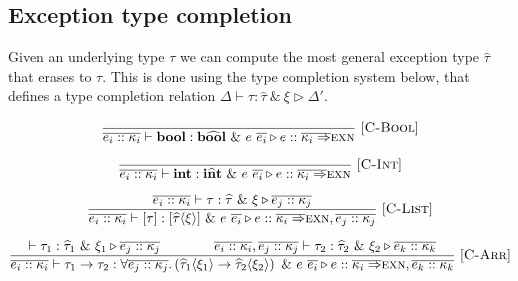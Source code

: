 \documentclass{llncs}
\newcommand{\VER}{\\[1.5ex]}
\newcommand{\Rule}[3]{\frac{#2}{#3}\mbox{\ [\textsc{#1}]}}
\newcommand{\Throws}[2]{#1\langle #2\rangle}    %
\newcommand{\ExnTy}{\widehat\tau}
\newcommand{\ExnTyBool}{\mathrm{b\widehat{oo}l}}    %
\newcommand{\ExnTyList}[2]{\left[\Throws{#1}{#2}\right]\!}
\newcommand{\ExnTyArr}[4]{\Throws{#1}{#2} \to \Throws{#3}{#4}}
\newcommand{\ExnForall}[1]{\forall {#1}.}           %
\newcommand{\Exn}{\xi}
\newcommand{\ExnVar}{e}
\newcommand{\ExnBool}{\mathbf{b\widehat{oo}l}}      %
\newcommand{\ExnInt}{\mathbf{i\widehat{n}t}}        %
\newcommand{\Kind}{\kappa}                          %
\newcommand{\KindEXN}{\textsc{exn}}
\newcommand{\KindArr}{\Rightarrow}
\newcommand{\KindENV}{\Delta}
\newcommand{\KindEnv}[1]{{\overline{\ExnVar_{#1} :: \Kind_{#1}}}}
\newcommand{\JudgeComplete}[5]{{#1 \vdash #2 : #3\ \&\ #4 \triangleright #5}}
\newcommand{\Ty}{\tau}
\newcommand{\TyBool}{\mathbf{bool}}
\newcommand{\TyInt}{\mathbf{int}}
\newcommand{\TyList}[1]{\left[#1\right]}
\newcommand{\TyArr}[2]{#1 \to #2}
\begin{document}
\subsection{Exception type completion}

Given an underlying type $\Ty$ we can compute the most general exception type $\ExnTy$ that erases to $\Ty$. This is done using the type completion system below, that defines a type completion relation $\JudgeComplete{\KindENV}{\Ty}{\ExnTy}{\Exn}{\KindENV'}$.

    \begin{gather*}
        \Rule{C-Bool}
             {}
             {\JudgeComplete{\KindEnv{i}}
                            {\TyBool}
                            {\ExnBool}
                            {\ExnVar\ \overline{\ExnVar_i}}
                            {\ExnVar :: \overline{\Kind_i\KindArr}\KindEXN}
             }
        \VER
        \Rule{C-Int}
             {}
             {\JudgeComplete{\KindEnv{i}}
                            {\TyInt}
                            {\ExnInt}
                            {\ExnVar\ \overline{\ExnVar_i}}
                            {\ExnVar :: \overline{\Kind_i\KindArr}\KindEXN}
             }
        \VER
        \Rule{C-List}
             {\JudgeComplete{\KindEnv{i}}
                            {\Ty}
                            {\ExnTy}
                            {\Exn}
                            {\KindEnv{j}}
             }
             {\JudgeComplete{\KindEnv{i}}
                            {\TyList{\Ty}}
                            {\ExnTyList{\ExnTy}{\Exn}}
                            {\ExnVar\ \overline{\ExnVar_i}}
                            {\ExnVar :: \overline{\Kind_i\KindArr}%
                                \KindEXN, \KindEnv{j}}
             }
        \VER
        \Rule{C-Arr}
             {\JudgeComplete{}
                            {\Ty_1}
                            {\ExnTy_1}
                            {\Exn_1}
                            {\KindEnv{j}}
              \quad\quad\quad\quad
              \JudgeComplete{\KindEnv{i},\KindEnv{j}}
                            {\Ty_2}
                            {\ExnTy_2}
                            {\Exn_2}
                            {\KindEnv{k}}
             }
             {\JudgeComplete{\KindEnv{i}}
                            {\TyArr{\Ty_1}{\Ty_2}}
                            {\ExnForall{\overline{\ExnVar_j :: \Kind_j}}\left(\ExnTyArr{\ExnTy_1}{\Exn_1}{\ExnTy_2}{\Exn_2}\right)}
                            {\ExnVar\ \overline{\ExnVar_i}}
                            {\ExnVar :: \overline{\Kind_i\KindArr}%
                                \KindEXN, \KindEnv{k}}
             }
        \VER
    \end{gather*}
\end{document}
